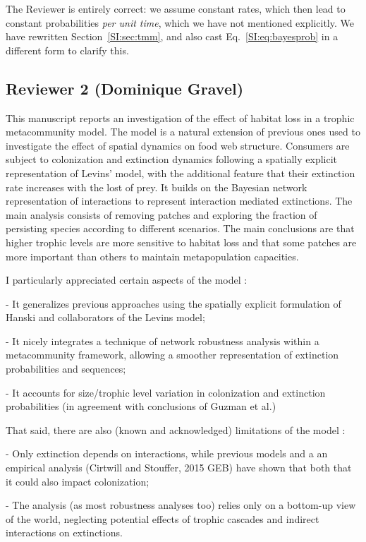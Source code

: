 \documentclass[11pt]{article}
\newcommand{\us}{\rm \setlength{\leftskip}{0.3cm} \setlength{\rightskip}{0.3cm}}
\newcommand{\them}{\it \setlength{\leftskip}{0cm} \setlength{\rightskip}{0cm}}
\begin{document}
\us

The Reviewer is entirely correct: we assume constant rates, which then lead to constant probabilities \emph{per unit time}, which we have not mentioned explicitly. We have rewritten Section~\ref{SI:sec:tmm}, and also cast Eq.~\ref{SI:eq:bayesprob} in a different form to clarify this.

\them


\subsection*{Reviewer 2 (Dominique Gravel)}

This manuscript reports an investigation of the effect of habitat loss in a trophic metacommunity model. The model is a natural extension of previous ones used to investigate the effect of spatial dynamics on food web structure. Consumers are subject to colonization and extinction dynamics following a spatially explicit representation of Levins' model, with the additional feature that their extinction rate increases with the lost of prey. It builds on the Bayesian network representation of interactions to represent interaction mediated extinctions. The main analysis consists of removing patches and exploring the fraction of persisting species according to different scenarios. The main conclusions are that higher trophic levels are more sensitive to habitat loss and that some patches are more important than others to maintain metapopulation capacities.

I particularly appreciated certain aspects of the model : 

- It generalizes previous approaches using the spatially explicit formulation of Hanski and collaborators of the Levins model;

- It nicely integrates a technique of network robustness analysis within a metacommunity framework, allowing a smoother representation of extinction probabilities and sequences;

- It accounts for size/trophic level variation in colonization and extinction probabilities (in agreement with conclusions of Guzman et al.)

That said, there are also (known and acknowledged) limitations of the model :

- Only extinction depends on interactions, while previous models and a an empirical analysis (Cirtwill and Stouffer, 2015 GEB) have shown that both that it could also impact colonization;

- The analysis (as most robustness analyses too) relies only on a bottom-up view of the world, neglecting potential effects of trophic cascades and indirect interactions on extinctions.
\end{document}

